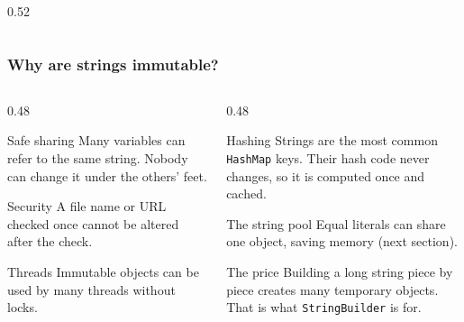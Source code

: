 \documentclass[aspectratio=169,10pt,compress]{beamer}
\begin{document}
\begin{frame}[t,fragile]
\begin{columns}[T]
\begin{column}{0.52\textwidth}
\begin{center}
      \end{center}
    \end{column}
  \end{columns}
\end{frame}




\begin{frame}[t,fragile] \frametitle{Why are strings immutable?}
  \begin{columns}[T]
    \begin{column}{0.48\textwidth}
      \begin{block}{Safe sharing}
        \small Many variables can refer to the same string. Nobody can change it under the others' feet.
      \end{block}
      \begin{block}{Security}
        \small A file name or URL checked once cannot be altered after the check.
      \end{block}
      \begin{block}{Threads}
        \small Immutable objects can be used by many threads without locks.
      \end{block}
    \end{column}
    \begin{column}{0.48\textwidth}
      \begin{block}{Hashing}
        \small Strings are the most common \texttt{HashMap} keys. Their hash code never changes,
        so it is computed once and cached.
      \end{block}
      \begin{block}{The string pool}
        \small Equal literals can share one object, saving memory (next section).
      \end{block}
      \begin{alertblock}{The price}
        \small Building a long string piece by piece creates many temporary objects.
        That is what \texttt{StringBuilder} is for.
      \end{alertblock}
    \end{column}
  \end{columns}
\end{frame}
\end{document}
